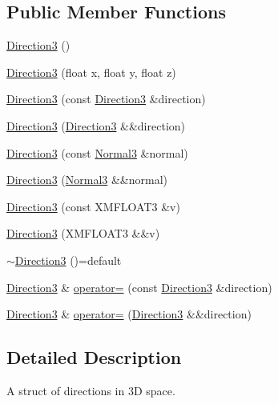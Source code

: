 \subsection*{Public Member Functions}
\begin{DoxyCompactItemize}
\item 
\hyperlink{structmage_1_1_direction3_a29603b6349c5a313d5bd93e0b0235ff1}{Direction3} ()
\item 
\hyperlink{structmage_1_1_direction3_a1b2cd4ce14856da23dfa9c5facc90da2}{Direction3} (float x, float y, float z)
\item 
\hyperlink{structmage_1_1_direction3_a8f6264f5a7a7590e67f4efa8f0687cdd}{Direction3} (const \hyperlink{structmage_1_1_direction3}{Direction3} \&direction)
\item 
\hyperlink{structmage_1_1_direction3_a0cefb5629c90c18fe48e4528415f95e9}{Direction3} (\hyperlink{structmage_1_1_direction3}{Direction3} \&\&direction)
\item 
\hyperlink{structmage_1_1_direction3_a18282959c79c93d25488d72f944495e3}{Direction3} (const \hyperlink{structmage_1_1_normal3}{Normal3} \&normal)
\item 
\hyperlink{structmage_1_1_direction3_a1449bce28e2956adb85f015adfbb1c0d}{Direction3} (\hyperlink{structmage_1_1_normal3}{Normal3} \&\&normal)
\item 
\hyperlink{structmage_1_1_direction3_ad0fc0b33474900b8cb2a803ffad13dbc}{Direction3} (const X\+M\+F\+L\+O\+A\+T3 \&v)
\item 
\hyperlink{structmage_1_1_direction3_a132a0633d3da6c63e533d8bf310bde48}{Direction3} (X\+M\+F\+L\+O\+A\+T3 \&\&v)
\item 
\hyperlink{structmage_1_1_direction3_a583c087dc366d206aaf54a33bc90c50b}{$\sim$\+Direction3} ()=default
\item 
\hyperlink{structmage_1_1_direction3}{Direction3} \& \hyperlink{structmage_1_1_direction3_a3b3251fcafc37b39bad2c89e5faa09bd}{operator=} (const \hyperlink{structmage_1_1_direction3}{Direction3} \&direction)
\item 
\hyperlink{structmage_1_1_direction3}{Direction3} \& \hyperlink{structmage_1_1_direction3_aaf4d2b9927d99ab3b703c1e6e61a5f36}{operator=} (\hyperlink{structmage_1_1_direction3}{Direction3} \&\&direction)
\end{DoxyCompactItemize}


\subsection{Detailed Description}
A struct of directions in 3D space. 

